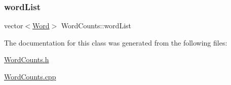 \mbox{\label{class_word_counts_a4ccb249072e42c130714f34ad3af129e}} 
\subsubsection{\texorpdfstring{word\+List}{wordList}}
{\footnotesize\ttfamily vector$<$\hyperlink{class_word}{Word}$>$ Word\+Counts\+::word\+List}



The documentation for this class was generated from the following files\+:\begin{DoxyCompactItemize}
\item 
\hyperlink{_word_counts_8h}{Word\+Counts.\+h}\item 
\hyperlink{_word_counts_8cpp}{Word\+Counts.\+cpp}\end{DoxyCompactItemize}
